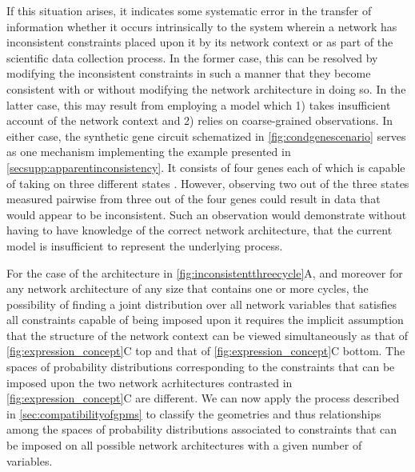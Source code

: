 If this situation arises, it indicates some systematic error in the transfer of information whether it occurs intrinsically to the system wherein a network has inconsistent constraints placed upon it by its network context or as part of the scientific data collection process. In the former case, this can be resolved by modifying the inconsistent constraints in such a manner that they become consistent with or without modifying the network architecture in doing so. In the latter case, this may result from employing a model which 1) takes insufficient account of the network context and 2) relies on coarse-grained observations. In either case, the synthetic gene circuit schematized in \autoref{fig:condgenescenario} serves as one mechanism implementing the example presented in  \autoref{secsupp:apparentinconsistency}. It consists of four genes each of which is capable of taking on three different states \cite{Rieckh2013a}. However, observing two out of the three states measured pairwise from three out of the four genes could result in data that would appear to be inconsistent. Such an observation would demonstrate without having to have knowledge of the correct network architecture, that the current model is insufficient to represent the underlying process.

For the case of the architecture in \autoref{fig:inconsistentthreecycle}A, and moreover for any network architecture of any size that contains one or more cycles, the possibility of finding a joint distribution over all network variables that satisfies all constraints capable of being imposed upon it requires the implicit assumption that the structure of the network context can be viewed simultaneously as that of \autoref{fig:expression_concept}C top and that of \autoref{fig:expression_concept}C bottom. The spaces of probability distributions corresponding to the constraints that can be imposed upon the two network acrhitectures contrasted in \autoref{fig:expression_concept}C are different. We can now apply the process described in \autoref{sec:compatibilityofgpms} to classify the geometries and thus relationships among the spaces of probability distributions associated to constraints that can be imposed on all possible network architectures with a given number of variables.

